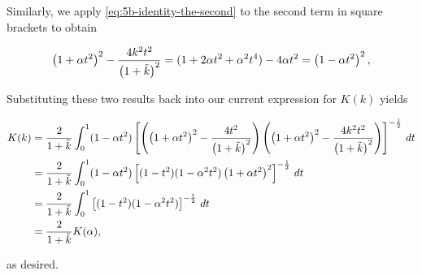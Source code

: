 \begin{solution}
  Similarly, we apply \eqref{eq:5b-identity-the-second} to the second term in square brackets to obtain

  $$
  \left(1 + \alpha t^2\right)^2 - \frac{4k^2t^2}{\left(1 + \tilde{k} \right)^2} 
    = (1 + 2 \alpha t^2 + \alpha^2 t^4) - 4 \alpha t^2
    = \left(1 - \alpha t^2\right)^2,
  $$

  \pagebreak
  Substituting these two results back into our current expression for $K(k)$ yields

  \begin{align*}
    K(k) &= \frac{2}{1 + \tilde{k}} \int_0^1 (1 - \alpha t^2)
            \left[
              \left(
                \left(1 + \alpha t^2\right)^2 - \frac{4t^2}{\left(1 + \tilde{k} \right)^2}
              \right)
              \left(
                \left(1 + \alpha t^2\right)^2 - \frac{4k^2t^2}{\left(1 + \tilde{k} \right)^2}
              \right)
            \right]^{-\frac{1}{2}} \, dt \\
         &= \frac{2}{1 + \tilde{k}} \int_0^1 (1 - \alpha t^2)
            \left[
              (1 - t^2)(1 - \alpha^2 t^2) \left(1 + \alpha t^2\right)^2 
            \right]^{-\frac{1}{2}} \, dt \\
         &= \frac{2}{1 + \tilde{k}} \int_0^1 
            \left[
              (1 - t^2)(1 - \alpha^2 t^2)
            \right]^{-\frac{1}{2}} \, dt \\
          &= \frac{2}{1 + \tilde{k}} K(\alpha),
  \end{align*}

  as desired.
  \ \\
\end{solution}